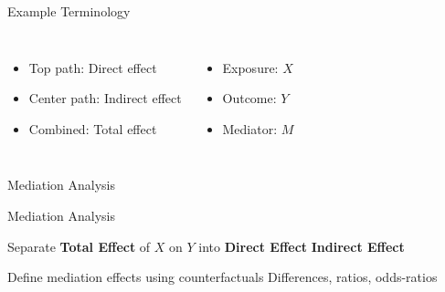 \documentclass[14pt]{beamer}
\begin{document}
\begin{frame}{Example}
    Terminology
    \begin{columns}
        \begin{itemize}
            \item Top path: {Direct effect}
            \item Center path: {Indirect effect}
            \item Combined: {Total effect}
        \end{itemize}
        \begin{itemize}
            \item Exposure: $X$
            \item Outcome: $Y$
            \item Mediator: $M$
        \end{itemize}
    \end{columns}
    
\end{frame}




\begin{frame}{Mediation Analysis}
    \begin{figure}[H]
    \end{figure}
\end{frame}

\begin{frame}{Mediation Analysis}
    \begin{outline}
        \1 Separate \textbf{Total Effect} of $X$ on $Y$ into
            \2 \textbf{Direct Effect}
            \2 \textbf{Indirect Effect}\newline

        \1 Define mediation effects using counterfactuals
        \1 Differences, ratios, odds-ratios
    \end{outline}    
\end{frame}
\end{document}
